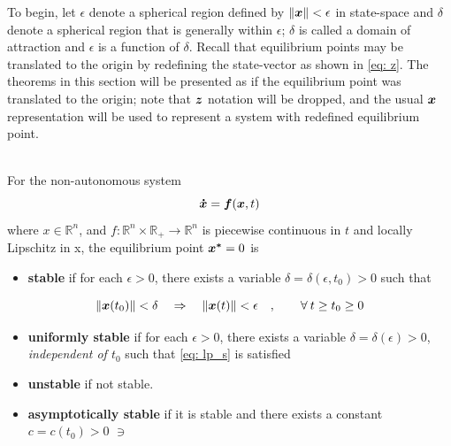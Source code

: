 \documentclass[12pt]{ucthesis}
\begin{document}
To begin, let $\epsilon$ denote a spherical region defined by $\lVert \boldsymbol{x} \rVert < \epsilon$ in state-space and $\delta$ denote a spherical region that is generally within $\epsilon$; $\delta$ is called a domain of attraction and $\epsilon$ is a function of $\delta$. Recall that equilibrium points may be translated to the origin by redefining the state-vector as shown in \autoref{eq: z}. The theorems in this section will be presented as if the equilibrium point was translated to the origin; note that $\boldsymbol{z}$ notation will be dropped, and the usual $\boldsymbol{x}$ representation will be used to represent a system with redefined equilibrium point.
%
\begin{defn} \alignright \citet[Def 3.2]{Khalil1996}\\
	For the non-autonomous system
	$$\boldsymbol{\dot{x}}=\boldsymbol{f}(\boldsymbol{x},t)$$
	where $x \in \mathbb{R}^n$, and $f:\mathbb{R}^n \times \mathbb{R}_+ \rightarrow \mathbb{R}^n$ is piecewise continuous in $t$ and locally Lipschitz in x, the equilibrium point $\boldsymbol{x^*}=0$ is
	\begin{itemize}[noitemsep,nosep,labelindent=\parindent,leftmargin=\parindent]%
		\item{\textbf{stable} if for each $\epsilon > 0$, there exists a variable $\delta = \delta(\epsilon, t_0) > 0$ such that}
	\end{itemize}
		\begin{equation}
			\lVert \boldsymbol{x}(t_0) \rVert < \delta \quad \Rightarrow \quad \lVert \boldsymbol{x}(t) \rVert < \epsilon \quad , \qquad \forall \: t \geq t_0 \geq 0 
			\label{eq: lp_s}
		\end{equation}
	\begin{itemize}[noitemsep,nosep,labelindent=\parindent,leftmargin=\parindent]%
		\item{\textbf{uniformly stable} if for each $\epsilon > 0$, there exists a variable $\delta = \delta (\epsilon) > 0$, \textit{independent of $t_0$} such that \autoref{eq: lp_s} is satisfied}
		\item{\textbf{unstable} if not stable.}
		\item{\textbf{asymptotically stable} if it is stable and there exists a constant $c = c(t_0)>0$ $\ni$}
	\end{itemize}
		\begin{equation}

\end{equation}
\end{defn}
\end{document}
